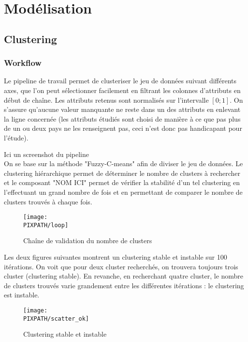\section{Modélisation}

\subsection{Clustering}

\subsubsection{Workflow}

Le pipeline de travail permet de clusteriser le jeu de données suivant
différents axes, que l'on peut sélectionner facilement en filtrant les
colonnes d'attributs en début de chaîne. Les attributs retenus sont
normalisés sur l'intervalle $[ 0 ; 1 ]$. On s'assure qu'aucune valeur
manquante ne reste dans un des attributs en enlevant la ligne concernée
(les attributs étudiés sont choisi de manière à ce que pas plus de un ou
deux pays ne les renseignent pas, ceci n'est donc pas handicapant pour
l'étude).

Ici un screenshot du pipeline\\

On se base sur la méthode "Fuzzy-C-means" afin de diviser le jeu de
données. Le clustering hiérarchique permet de déterminer le nombre de
clusters à rechercher et le composant "NOM ICI" permet de vérifier la stabilité
d'un tel clustering en l'effectuant un grand nombre de fois et en
permettant de comparer le nombre de clusters trouvés à chaque fois.\\

\begin{figure}[h]
\centering
\caption{Chaîne de validation du nombre de clusters}
\texttt{[image: \\PIXPATH/loop]}
\end{figure}

Les deux figures suivantes montrent un clustering stable et instable sur
100 itérations. On voit que pour deux cluster recherchés, on trouvera
toujours trois cluster (clustering stable). En revanche, en recherchant
quatre cluster, le nombre de clusters trouvés varie grandement entre les
différentes itérations : le clustering est instable.

\begin{figure}[h]
\centering
\caption{Clustering stable et instable}
\texttt{[image: \\PIXPATH/scatter\_ok]}
\end{figure}


